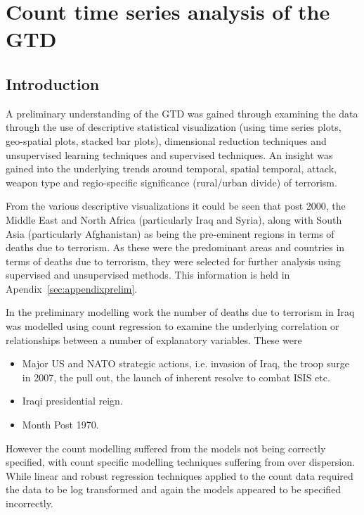 \chapter[Count time series aberration techniques]{Count time series analysis of the GTD}

\section{Introduction}
\label{sec:chap5intro}

A preliminary understanding of the GTD was gained through examining the data through the use of descriptive statistical visualization (using time series plots, geo-spatial plots, stacked bar plots), dimensional reduction techniques and unsupervised learning techniques and supervised techniques. An insight was gained into the underlying trends around temporal, spatial temporal, attack, weapon type and regio-specific significance (rural/urban divide) of terrorism. 

From the various descriptive visualizations it could be seen that post 2000, the Middle East and North Africa (particularly Iraq and Syria), along with South Asia (particularly Afghanistan) as being the pre-eminent regions in terms of deaths due to terrorism. As these were the predominant areas and countries in terms of deaths due to terrorism, they were selected for further analysis using supervised and unsupervised methods. This information is held in Apendix~\ref{sec:appendixprelim}.

In the preliminary modelling work the number of deaths due to terrorism in Iraq was modelled using count regression to examine the underlying correlation or relationships between a number of explanatory variables. These were 
\begin{itemize}
\item Major US and NATO strategic actions, i.e. invasion of Iraq, the troop surge in 2007, the pull out, the launch of inherent resolve to combat ISIS etc.
\item Iraqi presidential reign.
\item Month Post 1970.
\end{itemize}

However the count modelling suffered from the models not being correctly specified, with count specific modelling techniques suffering from over dispersion. While linear and robust regression techniques applied to the count data required the data to be log transformed and again the models appeared to be specified incorrectly.   

